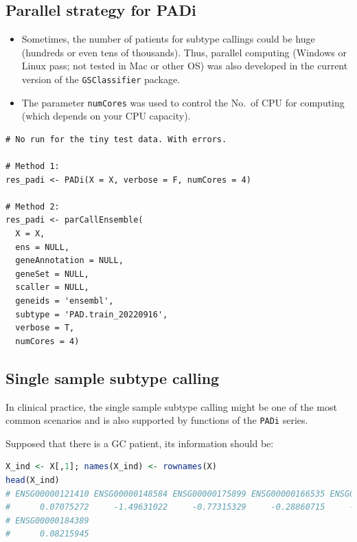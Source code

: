 \documentclass[
  12pt,
]{book}
\newcommand{\passthrough}[1]{#1}
\begin{document}
\hypertarget{parallel-strategy-for-padi}{%
\subsection{Parallel strategy for PADi}\label{parallel-strategy-for-padi}}

\begin{itemize}
\item
  Sometimes, the number of patients for subtype callings could be huge (hundreds or even tens of thousands). Thus, parallel computing (Windows or Linux pass; not tested in Mac or other OS) was also developed in the current version of the \passthrough{\lstinline!GSClassifier!} package.
\item
  The parameter \passthrough{\lstinline!numCores!} was used to control the No.~of CPU for computing (which depends on your CPU capacity).
\end{itemize}

\begin{lstlisting}
# No run for the tiny test data. With errors.

# Method 1:
res_padi <- PADi(X = X, verbose = F, numCores = 4)

# Method 2: 
res_padi <- parCallEnsemble(
  X = X,
  ens = NULL,
  geneAnnotation = NULL,
  geneSet = NULL,
  scaller = NULL,
  geneids = 'ensembl',
  subtype = 'PAD.train_20220916',
  verbose = T,
  numCores = 4)
\end{lstlisting}

\hypertarget{single-sample-subtype-calling}{%
\subsection{Single sample subtype calling}\label{single-sample-subtype-calling}}

In clinical practice, the single sample subtype calling might be one of the most common scenarios and is also supported by functions of the \passthrough{\lstinline!PADi!} series.

Supposed that there is a GC patient, its information should be:

\begin{lstlisting}[language=R]
X_ind <- X[,1]; names(X_ind) <- rownames(X)
head(X_ind)
# ENSG00000121410 ENSG00000148584 ENSG00000175899 ENSG00000166535 ENSG00000256069 
#      0.07075272     -1.49631022     -0.77315329     -0.28860715     -0.25034243 
# ENSG00000184389 
#      0.08215945
\end{lstlisting}
\end{document}

